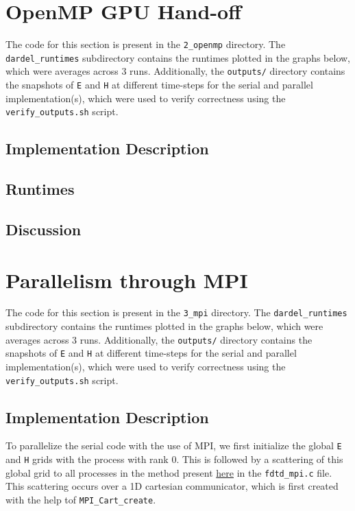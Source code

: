 \documentclass[a4paper,10pt]{article}
\begin{document}
\section{OpenMP GPU Hand-off}
The code for this section is present in the \verb|2_openmp| directory.
The \verb|dardel_runtimes| subdirectory contains the runtimes plotted in the graphs below, which were averages across 3 runs.
Additionally, the \verb|outputs/| directory contains the snapshots of \verb|E| and \verb|H| at different time-steps for the serial and parallel implementation(s), which were used to verify correctness using the \verb|verify_outputs.sh| script.

\subsection{Implementation Description}
\subsection{Runtimes}
\subsection{Discussion}

\section{Parallelism through MPI}
\label{sec:3_mpi}
The code for this section is present in the \verb|3_mpi| directory. The \verb|dardel_runtimes| subdirectory contains the runtimes plotted in the graphs below, which were averages across 3 runs. Additionally, the \verb|outputs/| directory contains the snapshots of \verb|E| and \verb|H| at different time-steps for the serial and parallel implementation(s), which were used to verify correctness using the \verb|verify_outputs.sh| script.

\subsection{Implementation Description}
To parallelize the serial code with the use of MPI, we first initialize the global \verb|E| and \verb|H| grids with the process with rank 0. This is followed by a scattering of this global grid to all processes in the method present \href{https://github.com/paulmyr/DD2356-MethodsHPC/blob/master/5_project/3_mpi/fdtd_mpi.c#L25}{here} in the \verb|fdtd_mpi.c| file. This scattering occurs over a 1D cartesian communicator, which is first created with the help tof \verb|MPI_Cart_create|. 
\end{document}
